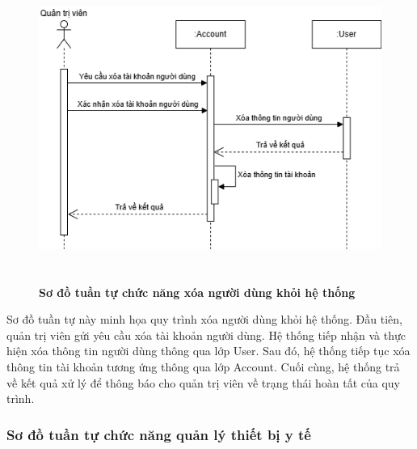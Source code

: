 \begin{figure}[H]
	\centering
	\includegraphics[width=12cm,height=10cm]{Images/sequence/user/delete.drawio.png}
	\caption[Sơ đồ tuần tự chức năng xóa người dùng khỏi hệ thống]{\bfseries \fontsize{12pt}{0pt}
		\selectfont Sơ đồ tuần tự chức năng xóa người dùng khỏi hệ thống}
	\label{sequence_delete_user} %
\end{figure}
Sơ đồ tuần tự này minh họa quy trình xóa người dùng khỏi hệ thống. Đầu tiên, quản trị viên gửi yêu cầu xóa tài khoản người dùng.
Hệ thống tiếp nhận và thực hiện xóa thông tin người dùng thông qua lớp User. Sau đó, hệ thống tiếp tục xóa thông tin tài khoản tương ứng thông qua lớp Account.
Cuối cùng, hệ thống trả về kết quả xử lý để thông báo cho quản trị viên về trạng thái hoàn tất của quy trình.

\subsubsection{Sơ đồ tuần tự chức năng quản lý thiết bị y tế}

